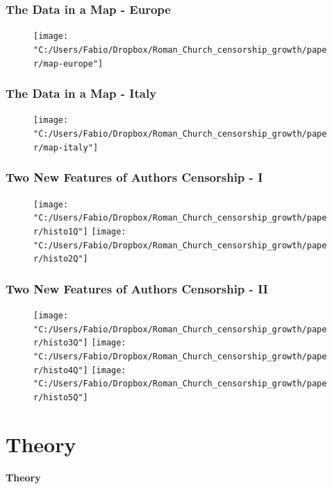 \documentclass[aspectratio=169,red,12pt]{beamer}
\begin{document}
\begin{frame}
\frametitle{The Data in a Map - Europe}
\begin{figure}
	\centering
	\texttt{[image: "C:/Users/Fabio/Dropbox/Roman\_Church\_censorship\_growth/paper/map-europe"]}
\end{figure}
\end{frame}

\begin{frame}
\frametitle{The Data in a Map - Italy }
\begin{figure}
	\texttt{[image: "C:/Users/Fabio/Dropbox/Roman\_Church\_censorship\_growth/paper/map-italy"]}
\end{figure}
\end{frame}



\begin{frame}
\frametitle{Two New Features of Authors Censorship - I}
\begin{figure}[p]
	\texttt{[image: "C:/Users/Fabio/Dropbox/Roman\_Church\_censorship\_growth/paper/histo1Q"]}
	\texttt{[image: "C:/Users/Fabio/Dropbox/Roman\_Church\_censorship\_growth/paper/histo2Q"]}
\end{figure}


\end{frame}


\begin{frame}
	\frametitle{Two New Features of Authors Censorship - II}
	\begin{figure}[p]
		\texttt{[image: "C:/Users/Fabio/Dropbox/Roman\_Church\_censorship\_growth/paper/histo3Q"]}
		\texttt{[image: "C:/Users/Fabio/Dropbox/Roman\_Church\_censorship\_growth/paper/histo4Q"]}
		\texttt{[image: "C:/Users/Fabio/Dropbox/Roman\_Church\_censorship\_growth/paper/histo5Q"]}
	\end{figure}
	
	
\end{frame}


\section{Theory}
 \begin{frame}{}
	\centering \Huge
	{\color{structure}\textbf{Theory}}
\end{frame}
\end{document}

